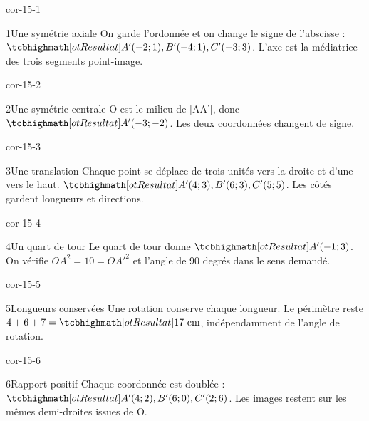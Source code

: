 \clearpage\pagestyle{otMain}\fontsize{11}{15}\selectfont{}
\begin{blocLivre}{cor-15-1}\begin{corrige}{1}{Une symétrie axiale}
On garde l’ordonnée et on change le signe de l’abscisse : $\res{A'(-2;1),B'(-4;1),C'(-3;3)}$. L’axe est la médiatrice des trois segments point-image.
\label{fig-cor-15-1}
\end{corrige}\end{blocLivre}
\begin{blocLivre}{cor-15-2}\begin{corrige}{2}{Une symétrie centrale}
O est le milieu de [AA’], donc $\res{A'(-3;-2)}$. Les deux coordonnées changent de signe.
\label{fig-cor-15-2}
\end{corrige}\end{blocLivre}
\begin{blocLivre}{cor-15-3}\begin{corrige}{3}{Une translation}
Chaque point se déplace de trois unités vers la droite et d’une vers le haut. $\res{A'(4;3),B'(6;3),C'(5;5)}$. Les côtés gardent longueurs et directions.
\label{fig-cor-15-3}
\end{corrige}\end{blocLivre}
\begin{blocLivre}{cor-15-4}\begin{corrige}{4}{Un quart de tour}
Le quart de tour donne $\res{A'(-1;3)}$. On vérifie $OA^2=10=OA'^2$ et l’angle de 90 degrés dans le sens demandé.
\label{fig-cor-15-4}
\end{corrige}\end{blocLivre}
\begin{blocLivre}{cor-15-5}\begin{corrige}{5}{Longueurs conservées}
Une rotation conserve chaque longueur. Le périmètre reste $4+6+7=\res{17\text{ cm}}$, indépendamment de l’angle de rotation.
\label{fig-cor-15-5}
\end{corrige}\end{blocLivre}
\begin{blocLivre}{cor-15-6}\begin{corrige}{6}{Rapport positif}
Chaque coordonnée est doublée : $\res{A'(4;2),B'(6;0),C'(2;6)}$. Les images restent sur les mêmes demi-droites issues de O.
\label{fig-cor-15-6}
\end{corrige}\end{blocLivre}
